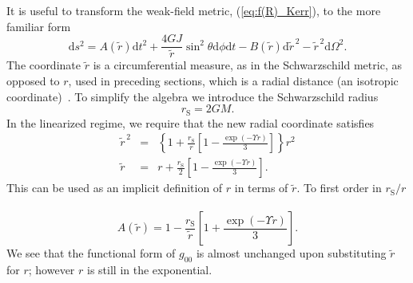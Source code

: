 \documentclass[aps,prd,amsfonts,amssymb,amsmath,nofootinbib,reprint,showpacs]{revtex4-1}
\newcommand{\eqnref}[1]{(\ref{eq:#1})}
\newcommand{\sub}[1]{\ensuremath{_\text{#1}}}
\newcommand{\dd}{\ensuremath{\text{d}}}
\begin{document}
It is useful to transform the weak-field metric, \eqnref{f(R)_Kerr}, to the more familiar form
\begin{equation}
\dd s^2 = A(\widetilde{r}) \dd t^2 + \frac{4GJ}{\widetilde{r}} \sin^2\theta \dd \phi \dd t- B(\widetilde{r})\dd \widetilde{r}^{\,2} - \widetilde{r}^{\,2} \dd \Omega^2.
\label{eq:Sph_sym}
\end{equation}
The coordinate $\widetilde{r}$ is a circumferential measure, as in the Schwarzschild metric, as opposed to $r$, used in preceding sections, which is a radial distance (an isotropic coordinate)~\cite{Misner1973, Olmo2007c}. To simplify the algebra we introduce the Schwarzschild radius
\begin{equation}
r\sub{S} = 2GM.
\end{equation}
In the linearized regime, we require that the new radial coordinate satisfies
\begin{eqnarray}
\widetilde{r}^{\,2} & = & \left\{1 + \frac{r\sub{S}}{r}\left[1 - \frac{\exp(-\Upsilon r)}{3}\right]\right\}r^2 \\
\widetilde{r} & = & r + \frac{r\sub{S}}{2}\left[1 - \frac{\exp(-\Upsilon r)}{3}\right].
\label{eq:r_tilde}
\end{eqnarray}
This can be used as an implicit definition of $r$ in terms of $\widetilde{r}$. To first order in ${r\sub{S}}/{r}$~\cite{Olmo2007c}
\begin{equation}
A(\widetilde{r}) = 1 - \frac{r\sub{S}}{\widetilde{r}}\left[1 + \frac{\exp(-\Upsilon r )}{3}\right].
\label{eq:A_metric}
\end{equation}
We see that the functional form of $g_{00}$ is almost unchanged upon substituting $\widetilde{r}$ for $r$; however $r$ is still in the exponential.
\end{document}
